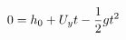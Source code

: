 \documentclass[preview]{standalone}
\begin{document}
\begin{align*}
\special{dvisvgm:raw <g id='unique000'>}0 = h_0 + U_y t - \frac{1}{2} g t^2\special{dvisvgm:raw </g>}
\end{align*}
\end{document}
